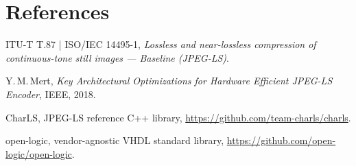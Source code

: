 \documentclass[10pt,a4paper]{article}
\begin{document}
\section*{References}
\begin{enumerate}[label={[\arabic*]}, leftmargin=*, itemsep=2pt]
  \item ITU-T T.87 | ISO/IEC 14495-1, \emph{Lossless and near-lossless compression of continuous-tone still images --- Baseline (JPEG-LS)}.
  \item Y.\,M.\,Mert, \emph{Key Architectural Optimizations for Hardware Efficient JPEG-LS Encoder}, IEEE, 2018.
  \item CharLS, JPEG-LS reference C++ library, \url{https://github.com/team-charls/charls}.
  \item open-logic, vendor-agnostic VHDL standard library, \url{https://github.com/open-logic/open-logic}.
\end{enumerate}
\end{document}
